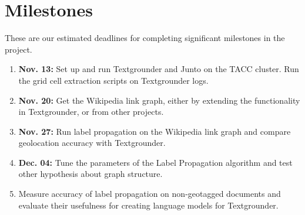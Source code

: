 \section{Milestones}
These are our estimated deadlines for completing significant milestones in the project.
\begin{enumerate}
    \item \textbf{Nov. 13:} Set up and run Textgrounder and Junto on the TACC cluster. Run the grid cell extraction scripts on Textgrounder logs.
    \item \textbf{Nov. 20:} Get the Wikipedia link graph, either by extending the functionality in Textgrounder, or from other projects.
    \item \textbf{Nov. 27:} Run label propagation on the Wikipedia link graph and compare geolocation accuracy with Textgrounder.
    \item \textbf{Dec. 04:} Tune the parameters of the Label Propagation algorithm and test other hypothesis about graph structure.
    \item Measure accuracy of label propagation on non-geotagged documents and evaluate their usefulness for creating language models for Textgrounder.
\end{enumerate}
